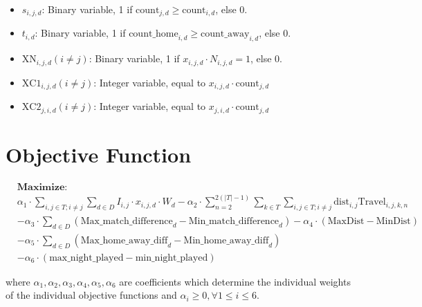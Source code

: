 \documentclass[a4paper, 12pt]{article}
\begin{document}
\begin{itemize}
    \item $s_{i,j,d}$: Binary variable, 1 if $\text{count}_{j,d} \geq \text{count}_{i,d}$, else 0.
    \item $t_{i,d}$: Binary variable, 1 if $\text{count\_home}_{i,d} \geq \text{count\_away}_{i,d}$, else 0.
    \item $\text{XN}_{i,j,d} (i \neq j)$: Binary variable, 1 if $x_{i,j,d} \cdot N_{i,j,d} = 1$, else 0.
    \item $\text{XC1}_{i,j,d} (i \neq j)$: Integer variable, equal to $x_{i,j,d} \cdot \text{count}_{j,d}$
    \item $\text{XC2}_{j,i,d} (i \neq j)$: Integer variable, equal to $x_{j,i,d} \cdot \text{count}_{j,d}$
\end{itemize}

\section*{Objective Function}
\begin{align*}
&\textbf{Maximize: }\\ 
&\alpha_1 \cdot \sum_{i,j \in T; i \neq j} \sum_{d \in D} I_{i,j} \cdot x_{i,j,d} \cdot W_{d} - \alpha_2 \cdot \sum_{n = 2}^{2(|T| - 1)} \sum_{k \in T} \sum_{i,j \in T; i \neq j}  \text{dist}_{i,j}\text{Travel}_{i,j,k,n}  \\ 
&- \alpha_3 \cdot \sum_{d \in D} (\text{Max\_match\_difference}_{d} - \text{Min\_match\_difference}_{d}) - \alpha_4 \cdot (\text{MaxDist} - \text{MinDist})\\
&- \alpha_5 \cdot \sum_{d \in D} (\text{Max\_home\_away\_diff}_{d} - \text{Min\_home\_away\_diff}_{d}) \\
&- \alpha_6 \cdot (\text{max\_night\_played} - \text{min\_night\_played})
\end{align*}

where $\alpha_1, \alpha_2, \alpha_3, \alpha_4, \alpha_5, \alpha_6$ are coefficients which determine the individual weights of the individual objective functions and $\alpha_i \geq 0, \forall 1 \leq i \leq 6$.



\end{document}
